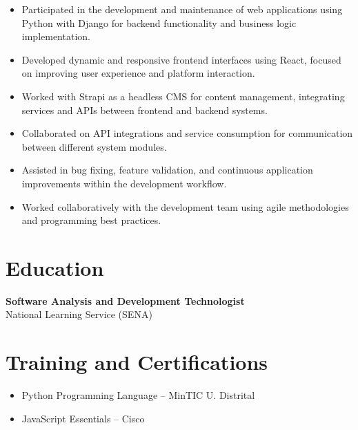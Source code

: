 \documentclass[11pt,a4paper]{article}
\begin{document}
\begin{itemize}[leftmargin=*]
    \item Participated in the development and maintenance of web applications using Python with Django for backend functionality and business logic implementation.
    
    \item Developed dynamic and responsive frontend interfaces using React, focused on improving user experience and platform interaction.
    
    \item Worked with Strapi as a headless CMS for content management, integrating services and APIs between frontend and backend systems.
    
    \item Collaborated on API integrations and service consumption for communication between different system modules.
    
    \item Assisted in bug fixing, feature validation, and continuous application improvements within the development workflow.
    
    \item Worked collaboratively with the development team using agile methodologies and programming best practices.
\end{itemize}

\section*{Education}

\textbf{Software Analysis and Development Technologist}\\
National Learning Service (SENA)

\section*{Training and Certifications}

\begin{itemize}[leftmargin=*]
    \item Python Programming Language -- MinTIC U. Distrital
    \item JavaScript Essentials -- Cisco
\end{itemize}
\end{document}
